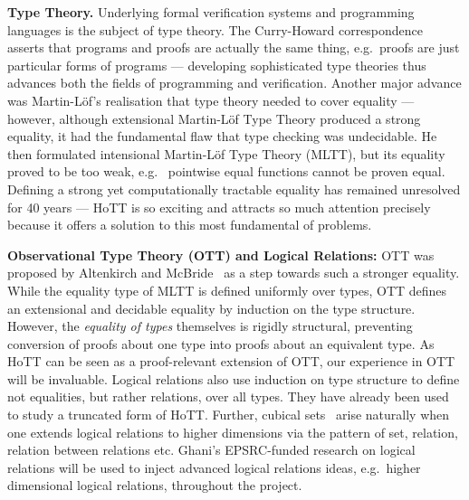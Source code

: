 \documentclass[a4paper,11pt]{article}
\newcommand{\eg}{{e.g.}\ }
\begin{document}
{\bf Type Theory.} Underlying formal verification systems and
programming languages is the subject of type theory. The
Curry-Howard correspondence asserts that programs and proofs are
actually the same thing, \eg proofs are just particular forms of
programs --- developing sophisticated type theories thus advances both 
the fields of programming and verification. Another
major advance was Martin-L\"of's realisation that type theory needed
to cover equality --- however, although 
extensional Martin-L\"of Type Theory produced
a strong equality, it had the fundamental flaw that type
checking was undecidable. He then formulated intensional Martin-L\"of
Type Theory (MLTT), but its equality proved to be too weak, \eg
pointwise equal functions cannot be proven equal. Defining a strong yet
computationally tractable equality has remained unresolved for 40
years --- HoTT is so exciting and attracts so much attention precisely because it offers a
solution to this most fundamental of problems.

{\bf Observational Type Theory (OTT) and Logical Relations:} OTT was
proposed by Altenkirch and McBride~\cite{alti:ott-conf} as a step
towards such a stronger equality. While the equality type of MLTT is
defined uniformly over types, OTT defines an extensional and
decidable equality by induction on the type structure. However, the
{\em equality of types} themselves is rigidly structural, preventing 
conversion of proofs about one type into proofs about an equivalent type. As
HoTT can be seen as a proof-relevant extension of OTT, our experience
in OTT will be invaluable.
Logical relations also use induction on type structure
to define not equalities, but rather relations, over all
types. They have already been
used~\cite{licataHarper:canonicity2d} to study a truncated form of
HoTT. Further, cubical sets~\cite{BezemM:cubsmt} 
arise naturally when one extends logical
relations to higher dimensions via the pattern of set, relation,
relation between relations etc. Ghani's EPSRC-funded research on
logical relations will be used to inject advanced logical relations
ideas, \eg higher dimensional logical relations, throughout
the project.



\end{document}
